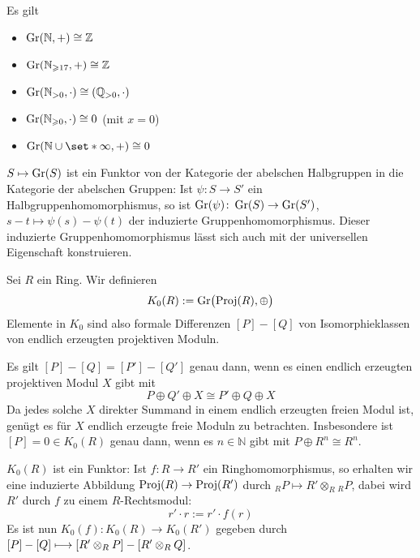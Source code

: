 \begin{beispiel}[{name=[{für Grothendiek-Konstruktionen}]}]
	Es gilt
	\begin{multicols}{2}
		\begin{itemize}
			\item $\Gr(\mathbb{N},+) \cong \mathbb{Z}$
			\item $\Gr(\mathbb{N}_{\ge 17},+) \cong \mathbb{Z}$
			\item $\Gr(\mathbb{N}_{>0},\cdot ) \cong (\mathbb{Q}_{>0},\cdot )$
			\item $\Gr(\mathbb{N}_{\ge 0},\cdot) \cong 0$ (mit $x=0$)
			\item $\Gr(\mathbb{N} \cup \set*{\infty},+) \cong 0$
		\end{itemize}
	\end{multicols}
\end{beispiel}

\begin{bemerkung}[{name=[{Funktorialität}]}]
	$S \mapsto \Gr(S)$ ist ein Funktor von der Kategorie der abelschen Halbgruppen in die Kategorie der abelschen Gruppen:
	Ist $\psi \colon S \to S'$ ein Halbgruppenhomomorphismus, so ist $\Gr(\psi) \colon \Gr(S) \to \Gr(S')$, $s-t \mapsto \psi(s) - \psi(t)$ der induzierte Gruppenhomomorphismus.
  Dieser induzierte Gruppenhomomorphismus lässt sich auch mit der universellen Eigenschaft konstruieren.
\end{bemerkung}

\begin{definition}[{name=[{$K_0$ von Ringen}]}]
	Sei $R$ ein Ring. 
	Wir definieren
	\[
		K_0(R) := \Gr \enbrace[\big]{\Proj(R),\oplus }
	\]
	Elemente in $K_0$ sind also formale Differenzen $[P]- [Q]$ von Isomorphieklassen von endlich erzeugten projektiven Moduln.
\end{definition}

Es gilt $[P] - [Q] = [P']- [Q']$ genau dann, wenn es einen endlich erzeugten projektiven Modul $X$ gibt mit
\[
	P \oplus Q' \oplus X \cong P' \oplus Q \oplus X
\]
Da jedes solche $X$ direkter Summand in einem endlich erzeugten freien Modul ist, genügt es für $X$ endlich erzeugte freie Moduln zu betrachten.
Insbesondere ist $[P]=0 \in K_0(R)$ genau dann, wenn es $n \in \mathbb{N}$ gibt mit $P \oplus R^n \cong R^n$.

\begin{bemerkung}[{name=[{Funktoreigenschaften der 0-ten K-Theorie}]}]
	$K_0(R)$ ist ein Funktor: Ist $f \colon R \to R'$ ein Ringhomomorphismus, so erhalten wir eine induzierte Abbildung $\Proj(R) \to \Proj(R')$ durch $_R P \mapsto  R' \otimes_R {_R P}$, dabei wird $R'$ durch $f$ zu einem $R$-Rechtsmodul:
	\[
		r' \cdot r := r' \cdot f(r)
	\]
	Es ist nun $K_0(f) \colon K_0(R) \to K_0(R')$ gegeben durch 
	\(
		[P]- [Q] \longmapsto \benbrace*{R' \otimes_R P} - \benbrace*{R' \otimes_R Q}
	\).
\end{bemerkung}

